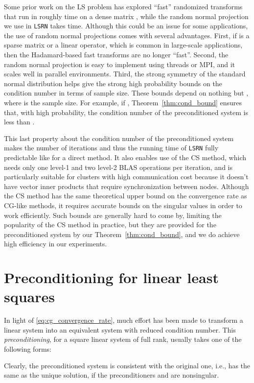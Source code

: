 \documentclass{siamltex}
\begin{document}
Some prior work on the LS problem has explored ``fast'' randomized transforms
that run in roughly  time on a dense matrix ,
while the random normal projection we use in \texttt{LSRN} takes  time.  Although this could be an issue for some applications, the use of
random normal projections comes with several advantages.  First, if  is a
sparse matrix or a linear operator, which is common in large-scale applications,
then the Hadamard-based fast transforms are no longer ``fast''. Second, the
random normal projection is easy to implement using threads or MPI, and it
scales well in parallel environments.  Third, the strong symmetry of the
standard normal distribution helps give the strong high probability bounds on
the condition number in terms of sample size. These bounds depend on nothing but
, where  is the sample size.  For example, if ,
Theorem~\ref{thm:cond_bound} ensures that, with high probability, the condition
number of the preconditioned system is less than .

This last property about the condition number of the preconditioned system makes
the number of iterations and thus the running time of \texttt{LSRN} fully
predictable like for a direct method. It also enables use of the
CS method, which needs only one level-1 and two level-2
BLAS operations per iteration, and is particularly suitable for clusters with
high communication cost because it doesn't have vector inner products that
require synchronization between nodes.  Although the CS method has the same
theoretical upper bound on the convergence rate as CG-like methods, it requires
accurate bounds on the singular values in order to work efficiently.  Such
bounds are generally hard to come by, limiting the popularity of the CS method
in practice, but they are provided for the preconditioned system by our
Theorem~\ref{thm:cond_bound}, and we do achieve high efficiency in our
experiments.
 

\section{Preconditioning for linear least squares}
\label{sec:prec-line-least}

In light of \eqref{eq:cg_convergence_rate}, much effort has been made to
transform a linear system into an equivalent system with reduced condition
number. This \emph{preconditioning}, for a square linear system  of
full rank, usually takes one of the following forms:

Clearly, the preconditioned system is consistent with the original one, i.e.,
has the same  as the unique solution, if the preconditioners  and 
are nonsingular.
\end{document}
